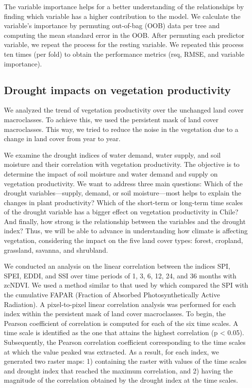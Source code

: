 \documentclass[
  authoryear,
  preprint,
  3p,
  onecolumn]{elsarticle}
\begin{document}
The variable importance helps for a better understanding of the
relationships by finding which variable has a higher contribution to the
model. We calculate the variable's importance by permuting out-of-bag
(OOB) data per tree and computing the mean standard error in the OOB.
After permuting each predictor variable, we repeat the process for the
resting variable. We repeated this process ten times (per fold) to
obtain the performance metrics (rsq, RMSE, and variable importance).

\hypertarget{drought-impacts-on-vegetation-productivity}{%
\subsection{Drought impacts on vegetation
productivity}\label{drought-impacts-on-vegetation-productivity}}

We analyzed the trend of vegetation productivity over the unchanged land
cover macroclasses. To achieve this, we used the persistent mask of land
cover macroclasses. This way, we tried to reduce the noise in the
vegetation due to a change in land cover from year to year.

We examine the drought indices of water demand, water supply, and soil
moisture and their correlation with vegetation productivity. The
objective is to determine the impact of soil moisture and water demand
and supply on vegetation productivity. We want to address three main
questions: Which of the drought variables---supply, demand, or soil
moisture---most helps to explain the changes in plant productivity?
Which of the short-term or long-term time scales of the drought variable
has a bigger effect on vegetation productivity in Chile? And finally,
how strong is the relationship between the variables and the drought
index? Thus, we will be able to advance in understanding how climate is
affecting vegetation, considering the impact on the five land cover
types: forest, cropland, grassland, savanna, and shrubland.

We conducted an analysis on the linear correlation between the indices
SPI, SPEI, EDDI, and SSI over time periods of 1, 3, 6, 12, 24, and 36
months with zcNDVI. We used a method similar to that used by
\citet{Meroni2017} which compared the SPI with the cumulative FAPAR
(Fraction of Absorbed Photosynthetically Active Radiation). A
pixel-to-pixel linear correlation analysis was performed for each index
within the persistent mask of land cover macroclasses. To begin, the
Pearson coefficient of correlation is computed for each of the six time
scales. A time scale is identified as the one that attains the highest
correlation (p \textless{} 0.05). Subsequently, the Pearson correlation
coefficient corresponding to the time scales at which the value peaked
was extracted. As a result, for each index, we generated two raster
maps: 1) containing the raster with values of the time scales and
drought index that reached the maximum correlation, and 2) having the
magnitude of the correlation obtained by the drought index at the time
scales.
\end{document}
